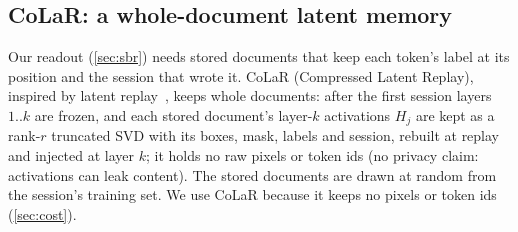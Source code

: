 \documentclass[10pt,twocolumn,letterpaper]{article}
\begin{document}
\begin{table}[t]
\centering\footnotesize
\setlength{\tabcolsep}{3pt}
\caption{\textbf{One principle, six repairs} (CIL-CORD, same CoLaR memory, full-label F1). How each repair treats a stored ``O'' label. $^{r}$Oracle: reads the true labels.}
\label{tab:scope}
\end{table}



\subsection{CoLaR: a whole-document latent memory}
\label{sec:memory}
Our readout (\cref{sec:sbr}) needs stored documents that keep each token's label at its position and the session that wrote it. CoLaR (Compressed Latent Replay), inspired by latent replay~\citep{hayes2020remind,pellegrini2020latent}, keeps whole documents: after the first session layers $1..k$ are frozen, and each stored document's layer-$k$ activations $H_j$ are kept as a rank-$r$ truncated SVD with its boxes, mask, labels and session, rebuilt at replay and injected at layer $k$; it holds no raw pixels or token ids (no privacy claim: activations can leak content). The stored documents are drawn at random from the session's training set. We use CoLaR because it keeps no pixels or token ids (\cref{sec:cost}).
\end{document}
